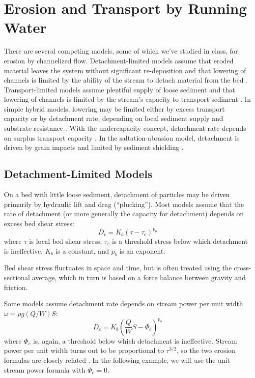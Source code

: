 \documentclass[12pt,reqno]{amsart}
\begin{document}
\section{Erosion and Transport by Running Water}

There are several competing models, some of which we've studied in
class, for erosion by channelized flow. Detachment-limited models
assume that eroded material leaves the system without significant
re-deposition and that lowering of channels is limited by the ability
of the stream to detach material from the bed \citep{howard1994detachment,whipple1999dynamics}. Transport-limited
models assume plentiful supply of loose sediment and that lowering of
channels is limited by the stream's capacity to transport
sediment \citep{willgoose1991coupled,whipple2002flux}. In simple hybrid models, lowering may be limited either by
excess transport capacity or by detachment rate, depending on local
sediment supply and substrate resistance
\citep{tucker2001child,whipple2002flux}. With the undercapacity
concept, detachment rate depends on surplus transport capacity \citep{beaumont1992erosional}.
In the saltation-abrasion model, detachment is driven by grain impacts
and limited by sediment shielding \citep{gasparini2007predictions,whipple2002flux}.

\subsection{Detachment-Limited Models}

On a bed with little loose sediment, detachment of particles may be driven primarily by hydraulic lift and drag (``plucking''). Most models assume that the rate of detachment (or more generally the capacity for detachment) depends on excess bed shear stress:
\begin{equation}
D_c = K_b \left( \tau - \tau_c \right)^{p_b}
\end{equation}
where $\tau$ is local bed shear stress, $\tau_c$ is a threshold stress below which detachment is ineffective, $K_b$ is a constant, and $p_b$ is an exponent.

Bed shear stress fluctuates in space and time, but is often treated using the cross-sectional average, which in turn is based on a force balance between gravity and friction.

Some models assume detachment rate depends on stream power per unit
width $\omega = \rho g (Q/W) S$:
\begin{equation}
D_c = K_b \left( \frac{Q}{W}S - \Phi_c \right)^{p_b}
\end{equation}
where $\Phi_c$ is, again, a threshold below which detachment is
ineffective. Stream power per unit width turns out to be proportional to $\tau^{3/2}$, so the two erosion formulas are closely related \citep{whipple1999dynamics}. In the following example, we will use the unit stream power formula with $\Phi_c=0$.
\end{document}
